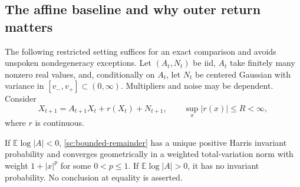 \subsection{The affine baseline and why outer return matters}
The following restricted setting suffices for an exact comparison and
avoids unspoken nondegeneracy exceptions. Let \((A_t,N_t)\) be iid,
\(A_t\) take finitely many nonzero real values, and, conditionally on
\(A_t\), let \(N_t\) be centered Gaussian with variance in
\([v_-,v_+]\subset(0,\infty)\). Multipliers and noise may be dependent.
Consider
\begin{equation}
 X_{t+1}=A_{t+1}X_t+r(X_t)+N_{t+1},\qquad \sup_x|r(x)|\le R<\infty,
 \label{sc:bounded-remainder}
\end{equation}
where \(r\) is continuous.

\begin{proposition}
\label{sc:outer-sign}
If \(\mathbb E\log|A|<0\), \eqref{sc:bounded-remainder} has a unique
positive Harris invariant probability and converges geometrically in a
weighted total-variation norm with weight \(1+|x|^p\) for some
\(0<p\le1\). If \(\mathbb E\log|A|>0\), it has no invariant probability.
No conclusion at equality is asserted.
\end{proposition}
